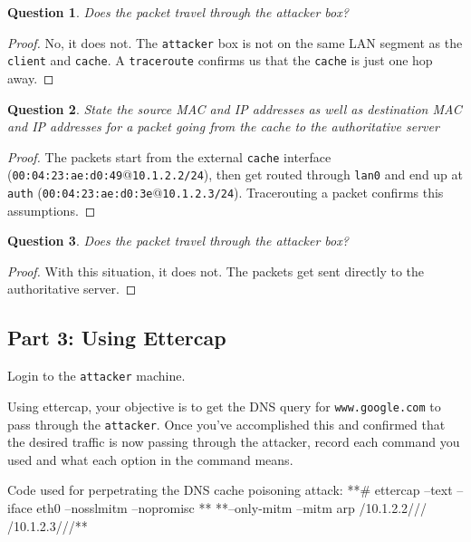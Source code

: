 \documentclass[a4paper,11pt,hidelinks]{article}
\newtheorem{theorem}{Question}[subsection]
\begin{document}
\begin{theorem}
    Does the packet travel through the attacker box?
\end{theorem}

\begin{proof}
    No, it does not. The \verb=attacker= box is not on the same LAN segment as the \verb=client= and \verb=cache=. A \verb=traceroute= confirms us that the \verb=cache= is just one hop away.
\end{proof}

\begin{theorem}
    State the source MAC and IP addresses as well as destination MAC and IP addresses for a packet going from the cache to the authoritative server
\end{theorem}

\begin{proof}
    The packets start from the external \verb=cache= interface (\verb=00:04:23:ae:d0:49=@\verb=10.1.2.2/24=), then get routed through \verb=lan0= and end up at \verb=auth= (\verb=00:04:23:ae:d0:3e=@\verb=10.1.2.3/24=). Tracerouting a packet confirms this assumptions.
\end{proof}

\begin{theorem}
    Does the packet travel through the attacker box?
\end{theorem}

\begin{proof}
    With this situation, it does not. The packets get sent directly to the authoritative server.
\end{proof}

\clearpage
\newpage
\subsection{Part 3: Using Ettercap}
Login to the \verb=attacker= machine. 

Using ettercap, your objective is to get the DNS query for \verb=www.google.com= to pass through the \verb=attacker=. Once you've accomplished this and confirmed that the desired traffic is now passing through the attacker, record each command you used and what each option in the command means.

\begin{code}{Code used for perpetrating the DNS cache poisoning attack:}
**# ettercap --text --iface eth0 --nosslmitm --nopromisc **
    **--only-mitm --mitm arp /10.1.2.2/// /10.1.2.3///**
\end{code}
\end{document}

